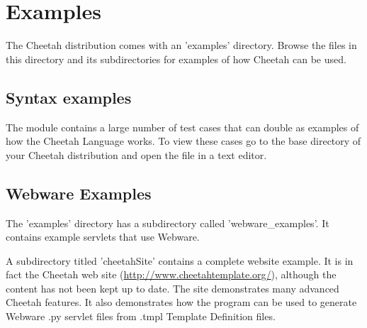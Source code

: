 \section{Examples}
\label{examples}

The Cheetah distribution comes with an 'examples' directory.  Browse the
files in this directory and its subdirectories for examples of how
Cheetah can be used.

\subsection{Syntax examples}
The  module contains a large number of test cases that can
double as examples of how the Cheetah Language works.  To view these cases go
to the base directory of your Cheetah distribution and open the file
 in a text editor.


\subsection{Webware Examples}
The 'examples' directory has a subdirectory called 'webware\_examples'.  It
contains example servlets that use Webware.  

A subdirectory titled 'cheetahSite' contains a complete website example. It
is in fact the Cheetah web site
(\url{http://www.cheetahtemplate.org/}), although the content has not been kept
up to date.  The site demonstrates many advanced Cheetah features.  It also
demonstrates how the  program can be used to generate
Webware .py servlet files from .tmpl Template Definition files.


